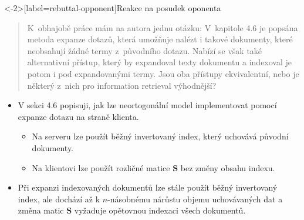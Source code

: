 \documentclass[aspectratio=169,t]{beamer}
\begin{document}

\begin{frame}<-2>[label=rebuttal-opponent]{Reakce na posudek oponenta}
\vspace*{-.1cm}
\begin{quote}
K~obhajobě práce mám na autora jednu otázku: V~kapitole 4.6 je popsána \alert<1>{metoda
expanze dotazů}, která umožňuje nalézt i takové dokumenty, které neobsahují
žádné termy z~původního dotazu. Nabízí se však také \alert<1>{alternativní přístup},
\alert<1>{který by expandoval texty dokumentu} a indexoval je potom i pod
expandovanými termy. \alert<1>{Jsou oba přístupy ekvivalentní}, nebo je některý
z~nich pro information retrieval výhodnější?
\end{quote}
\vspace*{-.1cm}
\begin{itemize}
  \item<2-> V sekci 4.6 popisuji, jak lze \alert<2-4>{neortogonální model
    implementovat pomocí expanze dotazu} na straně klienta.
  \begin{itemize}
    \item<3-> Na serveru lze použít \alert<3>{běžný invertovaný index},
      který uchovává původní dokumenty.
    \item<4-> Na klientovi lze použít \alert<4>{rozličné matice $\mathbf S$}
      bez změny obsahu indexu.
  \end{itemize}
  \item<5-> Při expanzi indexovaných dokumentů \alert<5>{lze stále použít běžný
    invertovaný index}, ale \alert<5>{dochází až k $n$-násobnému nárůstu objemu
    uchovávaných dat} a \alert<5>{změna matic $\mathbf S$ vyžaduje opětovnou
    indexaci} všech dokumentů.
\end{itemize}
\end{frame}
\end{document}
